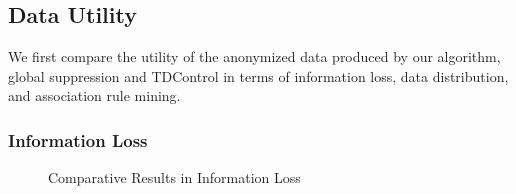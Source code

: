 
\subsection{Data Utility}\label{sec:eval:datautility}
We first compare the utility of the anonymized data produced by our algorithm,
global suppression and TDControl in terms of information loss, data distribution,
and association rule mining.

\subsubsection{Information Loss}\label{sec:eval:infoloss}

\begin{figure}[th]
\flushleft
{}
\caption{Comparative Results in Information Loss}\label{fig:loss}
\end{figure}

